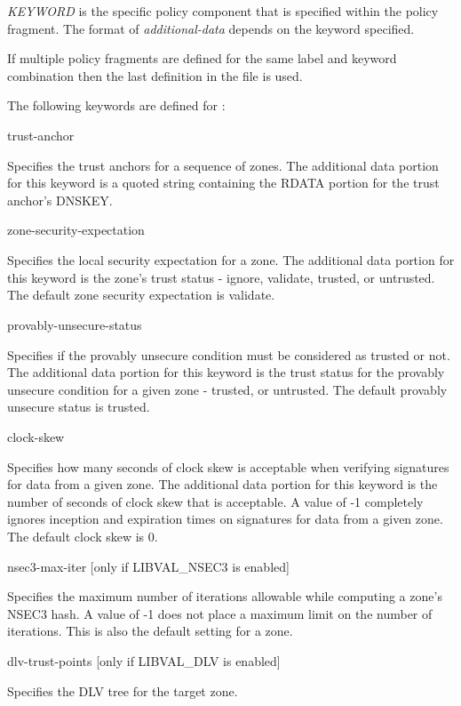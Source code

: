 \begin{description}
{\it KEYWORD} is the specific policy component that is specified within the 
policy fragment.  The format of {\it additional-data} depends on the 
keyword specified.

If multiple policy fragments are defined for the same label and keyword
combination then the last definition in the file is used.

The following keywords are defined for :

\begin{description}

\item trust-anchor\verb" "

Specifies the trust anchors for a sequence of zones.  The additional
data portion for this keyword is a quoted string containing the 
RDATA portion for the trust anchor's DNSKEY.

\item zone-security-expectation\verb" "

Specifies the local security expectation for a zone.  The additional
data portion for this keyword is the zone's trust status - 
ignore, validate, trusted, or untrusted.  The default zone security
expectation is validate.

\item provably-unsecure-status \verb" "

Specifies if the provably unsecure condition must be considered as 
trusted or not.  The additional data portion for this keyword is the 
trust status for the provably unsecure condition for a given zone - 
trusted, or untrusted.  The default provably unsecure status is trusted.

\item clock-skew \verb" "

Specifies how many seconds of clock skew is acceptable when verifying 
signatures for data from a given zone. The additional data portion 
for this keyword is the number of seconds of clock skew that is
acceptable.  A value of -1 completely ignores inception and expiration times 
on signatures for data from a given zone. The default clock skew is 0.

\item nsec3-max-iter [only if LIBVAL\_NSEC3 is enabled]\verb" "

Specifies the maximum number of iterations allowable while computing
a zone's NSEC3 hash.  A value of -1 does not place a maximum limit on
the number of iterations.  This is also the default setting for a zone.

\item dlv-trust-points [only if LIBVAL\_DLV is enabled]\verb" "

Specifies the DLV tree for the target zone. 

\end{description}

\end{description}


